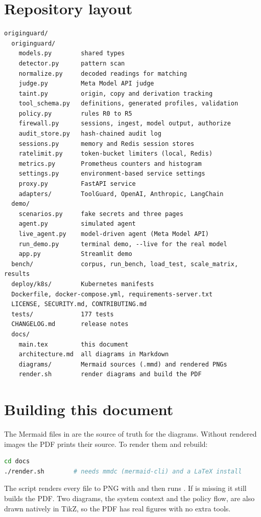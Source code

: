 \documentclass[11pt,a4paper]{article}
\newcommand{\code}[1]{\texttt{\detokenize{#1}}}
\newcounter{diagram}
\begin{document}
\section{Repository layout}
\begin{lstlisting}
originguard/
  originguard/
    models.py        shared types
    detector.py      pattern scan
    normalize.py     decoded readings for matching
    judge.py         Meta Model API judge
    taint.py         origin, copy and derivation tracking
    tool_schema.py   definitions, generated profiles, validation
    policy.py        rules R0 to R5
    firewall.py      sessions, ingest, model output, authorize
    audit_store.py   hash-chained audit log
    sessions.py      memory and Redis session stores
    ratelimit.py     token-bucket limiters (local, Redis)
    metrics.py       Prometheus counters and histogram
    settings.py      environment-based service settings
    proxy.py         FastAPI service
    adapters/        ToolGuard, OpenAI, Anthropic, LangChain
  demo/
    scenarios.py     fake secrets and three pages
    agent.py         simulated agent
    live_agent.py    model-driven agent (Meta Model API)
    run_demo.py      terminal demo, --live for the real model
    app.py           Streamlit demo
  bench/             corpus, run_bench, load_test, scale_matrix, results
  deploy/k8s/        Kubernetes manifests
  Dockerfile, docker-compose.yml, requirements-server.txt
  LICENSE, SECURITY.md, CONTRIBUTING.md
  tests/             177 tests
  CHANGELOG.md       release notes
  docs/
    main.tex         this document
    architecture.md  all diagrams in Markdown
    diagrams/        Mermaid sources (.mmd) and rendered PNGs
    render.sh        render diagrams and build the PDF
\end{lstlisting}

\section{Building this document}
The Mermaid files in \code{docs/diagrams} are the source of truth for the diagrams. Without rendered images the PDF prints their source. To render them and rebuild:
\begin{lstlisting}[language=bash]
cd docs
./render.sh        # needs mmdc (mermaid-cli) and a LaTeX install
\end{lstlisting}
The script renders every \code{.mmd} file to PNG with \code{mmdc} and then runs \code{latexmk}. If \code{mmdc} is missing it still builds the PDF. Two diagrams, the system context and the policy flow, are also drawn natively in TikZ, so the PDF has real figures with no extra tools.
\end{document}
